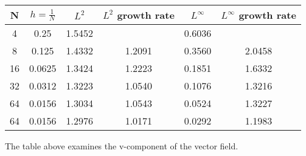 \documentclass{article}
\begin{document}
\begin{center}
    \begin{tabular}{||c c c c c c||} 
     \hline
     N & $h = \frac{1}{N}$ & $L^2$ & $L^2$ growth rate& $L^\infty$&$L^\infty$ growth rate \\ [0.5ex] 
     \hline\hline
     4 & 0.25 & 1.5452 &&  0.6036& \\ 
     \hline
     8 & 0.125 & 1.4332 &1.2091& 0.3560& 2.0458\\
     \hline
     16 & 0.0625 & 1.3424 &1.2223& 0.1851& 1.6332\\
     \hline
     32 & 0.0312 & 1.3223 &1.0540& 0.1076& 1.3216\\
     \hline
     64 & 0.0156 & 1.3034 &1.0543& 0.0524& 1.3227\\  
     \hline
     64 & 0.0156 & 1.2976 &1.0171& 0.0292&  1.1983\\ [1ex] 
     \hline
    \end{tabular}
    \end{center}
The table above examines the v-component of the vector field.
\end{document}
